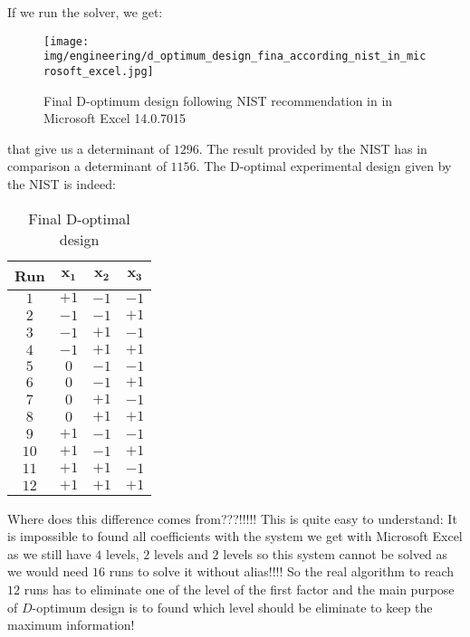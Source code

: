 	If we run the solver, we get:
	\begin{figure}[H]
		\centering
		\texttt{[image: img/engineering/d\_optimum\_design\_fina\_according\_nist\_in\_microsoft\_excel.jpg]}
		\caption{Final D-optimum design following NIST recommendation in in Microsoft Excel 14.0.7015}
	\end{figure}
	that give us a determinant of $1296$. The result provided by  the NIST has in comparison a determinant of $1156$. The D-optimal experimental design given by the NIST is indeed:
	\begin{table}[H]
	\begin{center}
			\begin{tabular}{|c|c|c|c|}
				\hline
				\cellcolor{black!30}\textbf{Run} & \cellcolor{black!30}\textbf{$\pmb{x_1}$} & \cellcolor{black!30}\textbf{$\pmb{x_2}$} & \cellcolor{black!30}\textbf{$\pmb{x_3}$}\\ \hline
				$1$ & $+1$ & $-1$ & $-1$ \\ \hline
				$2$ & $-1$ & $-1$ & $+1$ \\ \hline
				$3$ & $-1$ & $+1$ & $-1$ \\ \hline
				$4$ & $-1$ & $+1$ & $+1$ \\ \hline
				$5$ & $0$ & $-1$ & $-1$ \\ \hline
				$6$ & $0$ & $-1$ & $+1$ \\ \hline
				$7$ & $0$ & $+1$ & $-1$ \\ \hline
				$8$ & $0$ & $+1$ & $+1$ \\ \hline
				$9$ & $+1$ & $-1$ & $-1$ \\ \hline
				$10$ & $+1$ & $-1$ & $+1$ \\ \hline
				$11$ & $+1$ & $+1$ & $-1$ \\ \hline
				$12$ & $+1$ & $+1$ & $+1$ \\ \hline
		\end{tabular}
	\end{center}
	\caption{Final D-optimal design}
	\end{table}
	Where does this difference comes from???!!!!! This is quite easy to understand: It is impossible to found all coefficients with the system we get with Microsoft Excel as we still have $4$ levels, $2$ levels and $2$ levels so this system cannot be solved as we would need $16$ runs to solve it without alias!!!! So the real algorithm to reach $12$ runs has to eliminate one of the level of the first factor and the main purpose of $D$-optimum design is to found which level should be eliminate to keep the maximum information!
